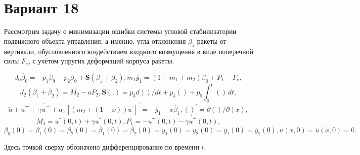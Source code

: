 \documentclass{article}
\begin{document}
    \section*{Вариант 18}
    
    Рассмотрим задачу о минимизации ошибки системы угловой стабилизатории подвижного объекта управления,
    а именно, угла отклонения $\beta_1$ ракеты от вертикали,
    обусловленного воздействием входного возмущения в виде поперечной силы $F_e$, с учётом упругих деформаций корпуса ракеты.

    \begin{equation*}
        J_0\ddot{\beta_0} = -p_1 \dot{\beta_0} - p_2\beta_0 + \mathbf{S}(\beta_1 + \beta_2),
        m_1\ddot{y_1} = (1 + m_1 + m_2)\beta_0 + P_1 - F_e, 
    \end{equation*}
    \begin{equation*}
        J_2(\ddot{\beta_1} + \ddot{\beta_2}) = M_2 - aP_2,
        \mathbf{S}(.) = p_3d()/dt + p_4 () + p_5\int_{0}^{t} () \,dt,
    \end{equation*}
    \begin{equation}
        \ddot{u} + u^{''''} + \gamma \dot{u^{''''}} + a_x[(m_2 + (1 - x))u^{'}]^{'} = -\ddot{y_1} - x \ddot{\beta_1},
        ()^{'} = \partial () / \partial (x),
    \end{equation}
    \begin{equation*}
        M_1 = u^{''}(0, t) + \gamma \dot{u^{''}}(0, t),
        P_1 = -u^{'''}(0, t) - \gamma \dot{u^{'''}}(0,t),
    \end{equation*}
    \begin{equation*}
        \beta_0(0) = \beta_1(0) = \beta_2(0) = \dot{\beta_1}(0) =
        \dot{\beta_2}(0) = y_1(0) = y_2(0) = \dot{y_1}(0) = \dot{y_2}(0),
        u(x, 0) = \dot{u}(x, 0) = 0.
    \end{equation*}

    Здесь точкой сверху обозначено дифференцирование по времени $t$.
    
\end{document}
